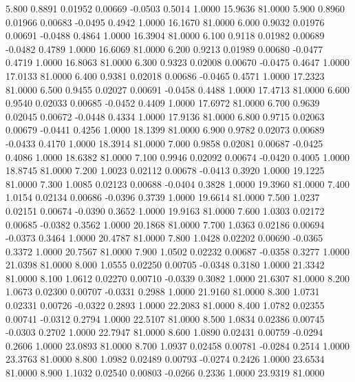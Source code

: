    5.800   0.8891   0.01952   0.00669  -0.0503   0.5014   1.0000  15.9636  81.0000
   5.900   0.8960   0.01966   0.00683  -0.0495   0.4942   1.0000  16.1670  81.0000
   6.000   0.9032   0.01976   0.00691  -0.0488   0.4864   1.0000  16.3904  81.0000
   6.100   0.9118   0.01982   0.00689  -0.0482   0.4789   1.0000  16.6069  81.0000
   6.200   0.9213   0.01989   0.00680  -0.0477   0.4719   1.0000  16.8063  81.0000
   6.300   0.9323   0.02008   0.00670  -0.0475   0.4647   1.0000  17.0133  81.0000
   6.400   0.9381   0.02018   0.00686  -0.0465   0.4571   1.0000  17.2323  81.0000
   6.500   0.9455   0.02027   0.00691  -0.0458   0.4488   1.0000  17.4713  81.0000
   6.600   0.9540   0.02033   0.00685  -0.0452   0.4409   1.0000  17.6972  81.0000
   6.700   0.9639   0.02045   0.00672  -0.0448   0.4334   1.0000  17.9136  81.0000
   6.800   0.9715   0.02063   0.00679  -0.0441   0.4256   1.0000  18.1399  81.0000
   6.900   0.9782   0.02073   0.00689  -0.0433   0.4170   1.0000  18.3914  81.0000
   7.000   0.9858   0.02081   0.00687  -0.0425   0.4086   1.0000  18.6382  81.0000
   7.100   0.9946   0.02092   0.00674  -0.0420   0.4005   1.0000  18.8745  81.0000
   7.200   1.0023   0.02112   0.00678  -0.0413   0.3920   1.0000  19.1225  81.0000
   7.300   1.0085   0.02123   0.00688  -0.0404   0.3828   1.0000  19.3960  81.0000
   7.400   1.0154   0.02134   0.00686  -0.0396   0.3739   1.0000  19.6614  81.0000
   7.500   1.0237   0.02151   0.00674  -0.0390   0.3652   1.0000  19.9163  81.0000
   7.600   1.0303   0.02172   0.00685  -0.0382   0.3562   1.0000  20.1868  81.0000
   7.700   1.0363   0.02186   0.00694  -0.0373   0.3464   1.0000  20.4787  81.0000
   7.800   1.0428   0.02202   0.00690  -0.0365   0.3372   1.0000  20.7567  81.0000
   7.900   1.0502   0.02232   0.00687  -0.0358   0.3277   1.0000  21.0398  81.0000
   8.000   1.0555   0.02250   0.00705  -0.0348   0.3180   1.0000  21.3342  81.0000
   8.100   1.0612   0.02270   0.00710  -0.0339   0.3082   1.0000  21.6307  81.0000
   8.200   1.0673   0.02300   0.00707  -0.0331   0.2988   1.0000  21.9160  81.0000
   8.300   1.0731   0.02331   0.00726  -0.0322   0.2893   1.0000  22.2083  81.0000
   8.400   1.0782   0.02355   0.00741  -0.0312   0.2794   1.0000  22.5107  81.0000
   8.500   1.0834   0.02386   0.00745  -0.0303   0.2702   1.0000  22.7947  81.0000
   8.600   1.0890   0.02431   0.00759  -0.0294   0.2606   1.0000  23.0893  81.0000
   8.700   1.0937   0.02458   0.00781  -0.0284   0.2514   1.0000  23.3763  81.0000
   8.800   1.0982   0.02489   0.00793  -0.0274   0.2426   1.0000  23.6534  81.0000
   8.900   1.1032   0.02540   0.00803  -0.0266   0.2336   1.0000  23.9319  81.0000
